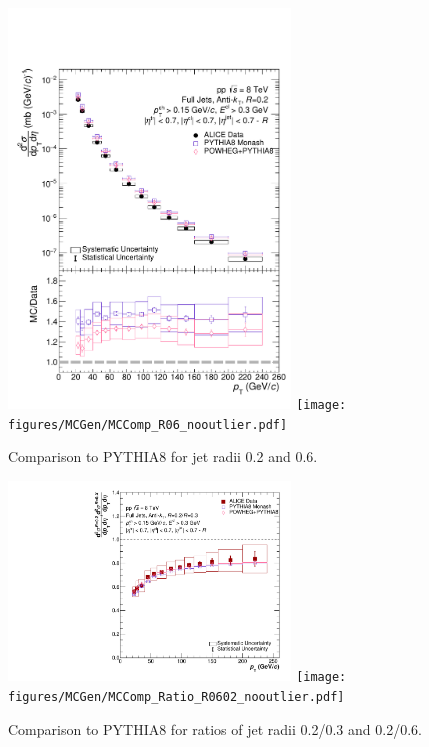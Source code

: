 \documentclass[ALICE]{ALICE_analysis_notes}
\begin{document}
\begin{figure}
    \centering
    \begin{multicols}{2}
            \includegraphics[width=7.5cm]{figures/MCGen/MCComp_R02_nooutlier.pdf}
        \vfill\null
        \columnbreak
            \texttt{[image: figures/MCGen/MCComp\_R06\_nooutlier.pdf]}
        \vfill\null
    \end{multicols}
    \caption{Comparison to PYTHIA8 for jet radii 0.2 and 0.6.}
    \label{fig:MCGen}
\end{figure}

\begin{figure}
    \centering
    \begin{multicols}{2}
            \includegraphics[width=7.5cm]{figures/MCGen/MCComp_Ratio_R0302_nooutlier.pdf}
        \vfill\null
        \columnbreak
            \texttt{[image: figures/MCGen/MCComp\_Ratio\_R0602\_nooutlier.pdf]}
        \vfill\null
    \end{multicols}
    \caption{Comparison to PYTHIA8 for ratios of jet radii 0.2/0.3 and 0.2/0.6.}
    \label{fig:MCGen_Ratio}
\end{figure}
\end{document}
